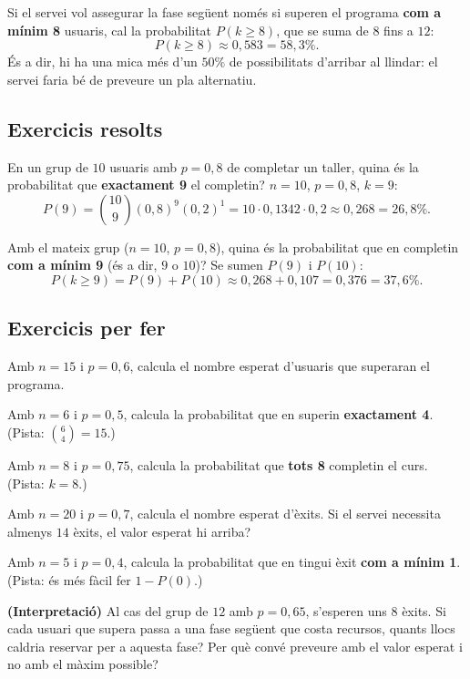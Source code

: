 \begin{exemple}
Si el servei vol assegurar la fase següent només si superen el programa \textbf{com a
mínim 8} usuaris, cal la probabilitat $P(k\ge 8)$, que se suma de $8$ fins a $12$:
\[
P(k\ge 8)\approx 0,583=58,3\%.
\]
És a dir, hi ha una mica més d'un $50\%$ de possibilitats d'arribar al llindar: el servei
faria bé de preveure un pla alternatiu.
\end{exemple}

\subsection{Exercicis resolts}

\begin{exresolt}
En un grup de $10$ usuaris amb $p=0,8$ de completar un taller, quina és la probabilitat
que \textbf{exactament 9} el completin?
\solucio
$n=10$, $p=0,8$, $k=9$:
\[
P(9)=\binom{10}{9}(0,8)^{9}(0,2)^{1}=10\cdot 0,1342\cdot 0,2\approx 0,268=26,8\%.
\]
\end{exresolt}

\begin{exresolt}
Amb el mateix grup ($n=10$, $p=0,8$), quina és la probabilitat que en completin
\textbf{com a mínim 9} (és a dir, $9$ o $10$)?
\solucio
Se sumen $P(9)$ i $P(10)$:
\[
P(k\ge 9)=P(9)+P(10)\approx 0,268+0,107=0,376=37,6\%.
\]
\end{exresolt}

\subsection{Exercicis per fer}

\begin{exercicis}
\begin{exlist}
  \item Amb $n=15$ i $p=0,6$, calcula el nombre esperat d'usuaris que superaran el
        programa.
  \item Amb $n=6$ i $p=0,5$, calcula la probabilitat que en superin \textbf{exactament
        4}. (Pista: $\binom{6}{4}=15$.)
  \item Amb $n=8$ i $p=0,75$, calcula la probabilitat que \textbf{tots 8} completin el
        curs. (Pista: $k=8$.)
  \item Amb $n=20$ i $p=0,7$, calcula el nombre esperat d'èxits. Si el servei necessita
        almenys $14$ èxits, el valor esperat hi arriba?
  \item Amb $n=5$ i $p=0,4$, calcula la probabilitat que en tingui èxit \textbf{com a
        mínim 1}. (Pista: és més fàcil fer $1-P(0)$.)
  \item \textbf{(Interpretació)} Al cas del grup de $12$ amb $p=0,65$, s'esperen uns $8$
        èxits. Si cada usuari que supera passa a una fase següent que costa recursos,
        quants llocs caldria reservar per a aquesta fase? Per què convé preveure amb el
        valor esperat i no amb el màxim possible?
\end{exlist}
\end{exercicis}

